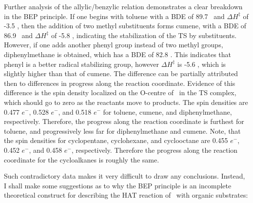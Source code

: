 Further analysis of the allylic/benzylic relation demonstrates a clear breakdown in the BEP principle. If one begins with toluene with a BDE of 89.7 \kcalmol\ and $\Delta H^\ddagger$ of -3.5 \kcalmol, then the addition of two methyl substituents forms cumene, with a BDE of 86.9 \kcalmol\ and $\Delta H^\ddagger$ of -5.8 \kcalmol, indicating the stabilization of the TS by substituents. However, if one adds another phenyl group instead of two methyl groups, diphenylmethane is obtained, which has a BDE of 82.8 \kcalmol. This indicates that phenyl is a better radical stabilizing group, however $\Delta H^\ddagger$ is -5.6 \kcalmol, which is slightly higher than that of cumene. The difference can be partially attributed then to differences in progress along the reaction coordinate. Evidence of this difference is the spin density localized on the O-centre of \cumo\ in the TS complex, which should go to zero as the reactants move to products. The  spin densities are 0.477 $e^-$, 0.528 $e^-$, and 0.518 $e^-$ for toluene, cumene, and diphenylmethane, respectively. Therefore, the progress along the reaction coordinate is furthest for toluene, and progressively less far for diphenylmethane and cumene. Note, that the  spin densities for cyclopentane, cyclohexane, and cyclooctane are 0.455 $e^-$, 0.452 $e^-$, and 0.458 $e^-$, respectively. Therefore the progress along the reaction coordinate for the cycloalkanes is roughly the same.

Such contradictory data makes it very difficult to draw any conclusions. Instead, I shall make some suggestions as to why the BEP principle is an incomplete theoretical construct for describing the HAT reaction of \cumo\ with organic substrates:

